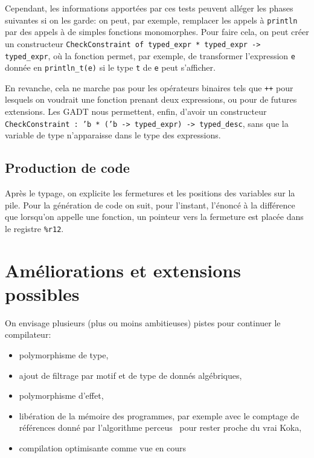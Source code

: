 \documentclass[11pt]{article}
\begin{document}
Cependant, les informations apportées par ces tests peuvent alléger les phases
suivantes si on les garde: on peut, par exemple, remplacer les appels à
\texttt{println} par des appels à de simples fonctions monomorphes. Pour faire
cela, on peut créer un constructeur \texttt{CheckConstraint of typed\_expr *
  typed\_expr -> typed\_expr}, où la fonction permet, par exemple, de
transformer l'expression \texttt{e} donnée en \texttt{println\_t(e)} si le type
\texttt{t} de \texttt{e} peut s'afficher.

En revanche, cela ne marche pas pour les opérateurs binaires tels que
\texttt{++} pour lesquels on voudrait une fonction prenant deux expressions, ou
pour de futures extensions. Les GADT nous permettent, enfin, d'avoir un
constructeur \texttt{\texttt{CheckConstraint : 'b * ('b -> typed\_expr) ->
    typed\_desc}}, sans que la variable de type n'apparaisse dans le type des
expressions.

\subsection{Production de code}
Après le typage, on explicite les fermetures et les positions des variables sur
la pile. Pour la génération de code on suit, pour l'instant, l'énoncé à la
différence que lorsqu'on appelle une fonction, un pointeur vers la fermeture est
placée dans le registre \texttt{\%r12}.

\section{Améliorations et extensions possibles}
On envisage plusieurs (plus ou moins ambitieuses) pistes pour continuer le
compilateur:
\begin{itemize}
  \item polymorphisme de type,
  \item ajout de filtrage par motif et de type de donnés algébriques,
  \item polymorphisme d'effet,
  \item libération de la mémoire des programmes, par exemple avec le comptage de
    références donné par l'algorithme perceus~\cite{reinking2021perceus} pour
    rester proche du vrai Koka,
  \item compilation optimisante comme vue en cours
\end{itemize}
\printbibliography
\end{document}
